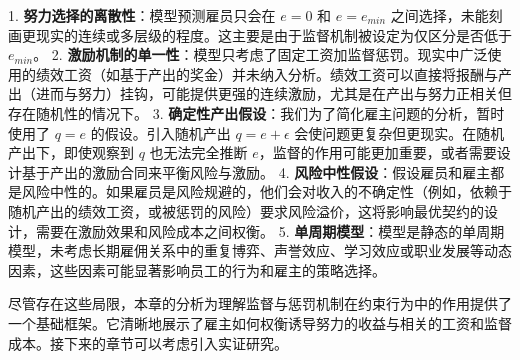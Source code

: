 1.  \textbf{努力选择的离散性}：模型预测雇员只会在 $e=0$ 和 $e=e_{min}$ 之间选择，未能刻画更现实的连续或多层级的程度。这主要是由于监督机制被设定为仅区分是否低于 $e_{min}$。
2.  \textbf{激励机制的单一性}：模型只考虑了固定工资加监督惩罚。现实中广泛使用的绩效工资（如基于产出的奖金）并未纳入分析。绩效工资可以直接将报酬与产出（进而与努力）挂钩，可能提供更强的连续激励，尤其是在产出与努力正相关但存在随机性的情况下。
3.  \textbf{确定性产出假设}：我们为了简化雇主问题的分析，暂时使用了 $q=e$ 的假设。引入随机产出 $q = e + \epsilon$ 会使问题更复杂但更现实。在随机产出下，即使观察到 $q$ 也无法完全推断 $e$，监督的作用可能更加重要，或者需要设计基于产出的激励合同来平衡风险与激励。
4.  \textbf{风险中性假设}：假设雇员和雇主都是风险中性的。如果雇员是风险规避的，他们会对收入的不确定性（例如，依赖于随机产出的绩效工资，或被惩罚的风险）要求风险溢价，这将影响最优契约的设计，需要在激励效果和风险成本之间权衡。
5.  \textbf{单周期模型}：模型是静态的单周期模型，未考虑长期雇佣关系中的重复博弈、声誉效应、学习效应或职业发展等动态因素，这些因素可能显著影响员工的行为和雇主的策略选择。

尽管存在这些局限，本章的分析为理解监督与惩罚机制在约束行为中的作用提供了一个基础框架。它清晰地展示了雇主如何权衡诱导努力的收益与相关的工资和监督成本。接下来的章节可以考虑引入实证研究。
